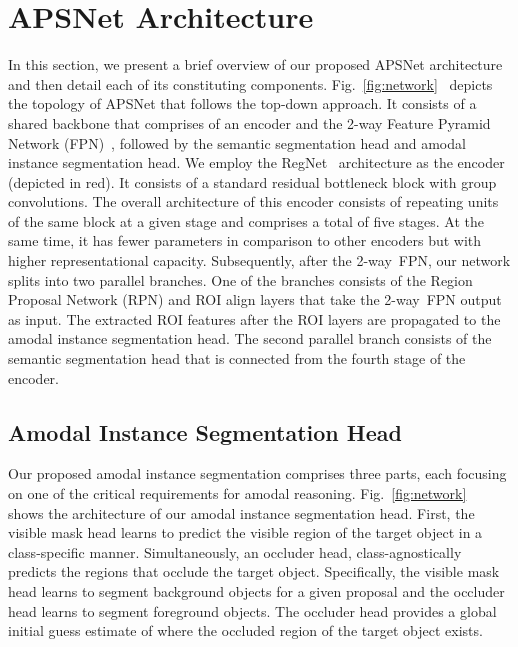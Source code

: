 \documentclass[10pt,twocolumn,letterpaper]{article}
\newcommand{\figref}[1]{Fig.~\ref{#1}}
\begin{document}
\section{APSNet Architecture}
In this section, we present a brief overview of our proposed \mbox{APSNet} architecture and then detail each of its constituting components. \figref{fig:network}~ depicts the topology of \mbox{APSNet} that follows the top-down approach. It consists of a shared backbone that comprises of an encoder and the 2-way Feature Pyramid Network (FPN)~\cite{mohan2020efficientps}, followed by the semantic segmentation head and amodal instance segmentation head. We employ the RegNet~\cite{radosavovic2020designing} architecture as the encoder (depicted in red). It consists of a standard residual bottleneck block with group convolutions. The overall architecture of this encoder consists of repeating units of the same block at a given stage and comprises a total of five stages. At the same time, it has fewer parameters in comparison to other encoders but with higher representational capacity. Subsequently, after the \mbox{2-way FPN}, our network splits into two parallel branches. One of the branches consists of the Region Proposal Network (RPN) and ROI align layers that take the \mbox{2-way FPN} output as input. The extracted ROI features after the ROI layers are propagated to the amodal instance segmentation head. The second parallel branch consists of the semantic segmentation head that is connected from the fourth stage of the encoder.

\subsection{Amodal Instance Segmentation Head}

Our proposed amodal instance segmentation comprises three parts, each focusing on one of the critical requirements for amodal reasoning. \figref{fig:network}~ shows the architecture of our amodal instance segmentation head. First, the visible mask head learns to predict the visible region of the target object in a class-specific manner. Simultaneously, an occluder head, class-agnostically predicts the regions that occlude the target object. Specifically, the visible mask head learns to segment background objects for a given proposal and the occluder head learns to segment foreground objects. The occluder head provides a global initial guess estimate of where the occluded region of the target object exists. 
\end{document}
